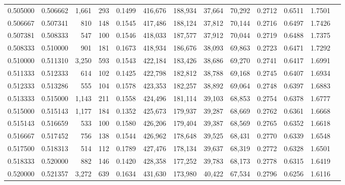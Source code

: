 \begin{tabular}{rrrrrrrrrrrrr}
0.505000 & 0.506662 & 1,661 & 293 &                                     0.1499 & 416,676 & 188,934 &  37,664 &  70,292 & 0.2712 & 0.6511 & 1.7501 \\
0.506667 & 0.507341 &   810 & 148 &                                     0.1545 & 417,486 & 188,124 &  37,812 &  70,144 & 0.2716 & 0.6497 & 1.7426 \\
0.507381 & 0.508333 &   547 & 100 &                                     0.1546 & 418,033 & 187,577 &  37,912 &  70,044 & 0.2719 & 0.6488 & 1.7375 \\
0.508333 & 0.510000 &   901 & 181 &                                     0.1673 & 418,934 & 186,676 &  38,093 &  69,863 & 0.2723 & 0.6471 & 1.7292 \\
0.510000 & 0.511310 & 3,250 & 593 &                                     0.1543 & 422,184 & 183,426 &  38,686 &  69,270 & 0.2741 & 0.6417 & 1.6991 \\
0.511333 & 0.512333 &   614 & 102 &                                     0.1425 & 422,798 & 182,812 &  38,788 &  69,168 & 0.2745 & 0.6407 & 1.6934 \\
0.512333 & 0.513286 &   555 & 104 &                                     0.1578 & 423,353 & 182,257 &  38,892 &  69,064 & 0.2748 & 0.6397 & 1.6883 \\
0.513333 & 0.515000 & 1,143 & 211 &                                     0.1558 & 424,496 & 181,114 &  39,103 &  68,853 & 0.2754 & 0.6378 & 1.6777 \\
0.515000 & 0.515143 & 1,177 & 184 &                                     0.1352 & 425,673 & 179,937 &  39,287 &  68,669 & 0.2762 & 0.6361 & 1.6668 \\
0.515143 & 0.516659 &   533 & 100 &                                     0.1580 & 426,206 & 179,404 &  39,387 &  68,569 & 0.2765 & 0.6352 & 1.6618 \\
0.516667 & 0.517452 &   756 & 138 &                                     0.1544 & 426,962 & 178,648 &  39,525 &  68,431 & 0.2770 & 0.6339 & 1.6548 \\
0.517500 & 0.518313 &   514 & 112 &                                     0.1789 & 427,476 & 178,134 &  39,637 &  68,319 & 0.2772 & 0.6328 & 1.6501 \\
0.518333 & 0.520000 &   882 & 146 &                                     0.1420 & 428,358 & 177,252 &  39,783 &  68,173 & 0.2778 & 0.6315 & 1.6419 \\
0.520000 & 0.521357 & 3,272 & 639 &                                     0.1634 & 431,630 & 173,980 &  40,422 &  67,534 & 0.2796 & 0.6256 & 1.6116 \\

\end{tabular}
